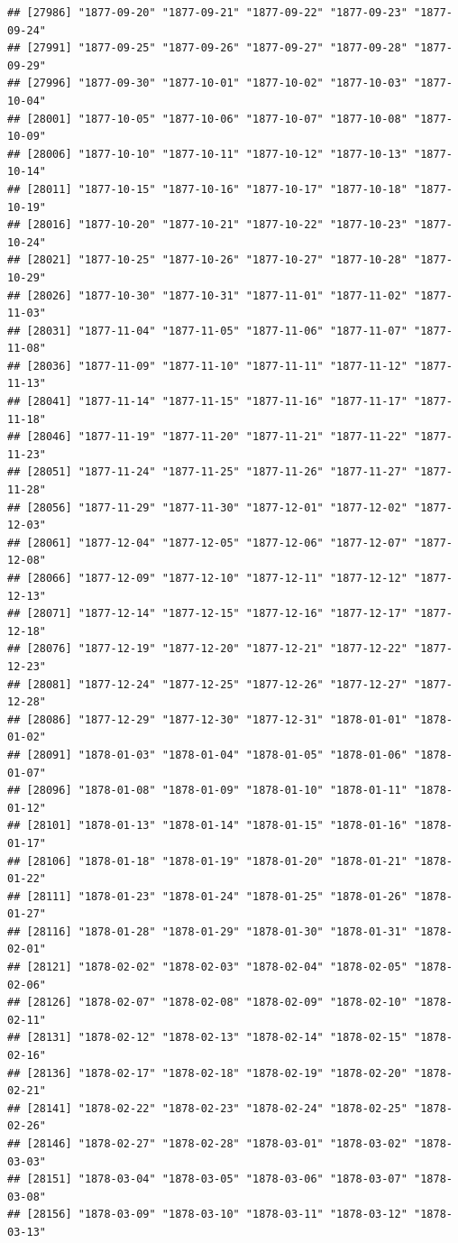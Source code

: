 \documentclass{article}\usepackage[]{graphicx}\usepackage[]{color}
\makeatletter
\newenvironment{kframe}{%
 \def\at@end@of@kframe{}%
 \ifinner\ifhmode%
  \def\at@end@of@kframe{\end{minipage}}%
  \begin{minipage}{\columnwidth}%
 \fi\fi%
 \def\FrameCommand##1{\hskip\@totalleftmargin \hskip-\fboxsep
 \colorbox{shadecolor}{##1}\hskip-\fboxsep
     \hskip-\linewidth \hskip-\@totalleftmargin \hskip\columnwidth}%
 \MakeFramed {\advance\hsize-\width
   \@totalleftmargin\z@ \linewidth\hsize
   \@setminipage}}%
 {\par\unskip\endMakeFramed%
 \at@end@of@kframe}
\newenvironment{knitrout}{}{} %
\makeatother
\begin{document}
\begin{description}
\begin{knitrout}
\begin{kframe}
\begin{verbatim}
## [27986] "1877-09-20" "1877-09-21" "1877-09-22" "1877-09-23" "1877-09-24"
## [27991] "1877-09-25" "1877-09-26" "1877-09-27" "1877-09-28" "1877-09-29"
## [27996] "1877-09-30" "1877-10-01" "1877-10-02" "1877-10-03" "1877-10-04"
## [28001] "1877-10-05" "1877-10-06" "1877-10-07" "1877-10-08" "1877-10-09"
## [28006] "1877-10-10" "1877-10-11" "1877-10-12" "1877-10-13" "1877-10-14"
## [28011] "1877-10-15" "1877-10-16" "1877-10-17" "1877-10-18" "1877-10-19"
## [28016] "1877-10-20" "1877-10-21" "1877-10-22" "1877-10-23" "1877-10-24"
## [28021] "1877-10-25" "1877-10-26" "1877-10-27" "1877-10-28" "1877-10-29"
## [28026] "1877-10-30" "1877-10-31" "1877-11-01" "1877-11-02" "1877-11-03"
## [28031] "1877-11-04" "1877-11-05" "1877-11-06" "1877-11-07" "1877-11-08"
## [28036] "1877-11-09" "1877-11-10" "1877-11-11" "1877-11-12" "1877-11-13"
## [28041] "1877-11-14" "1877-11-15" "1877-11-16" "1877-11-17" "1877-11-18"
## [28046] "1877-11-19" "1877-11-20" "1877-11-21" "1877-11-22" "1877-11-23"
## [28051] "1877-11-24" "1877-11-25" "1877-11-26" "1877-11-27" "1877-11-28"
## [28056] "1877-11-29" "1877-11-30" "1877-12-01" "1877-12-02" "1877-12-03"
## [28061] "1877-12-04" "1877-12-05" "1877-12-06" "1877-12-07" "1877-12-08"
## [28066] "1877-12-09" "1877-12-10" "1877-12-11" "1877-12-12" "1877-12-13"
## [28071] "1877-12-14" "1877-12-15" "1877-12-16" "1877-12-17" "1877-12-18"
## [28076] "1877-12-19" "1877-12-20" "1877-12-21" "1877-12-22" "1877-12-23"
## [28081] "1877-12-24" "1877-12-25" "1877-12-26" "1877-12-27" "1877-12-28"
## [28086] "1877-12-29" "1877-12-30" "1877-12-31" "1878-01-01" "1878-01-02"
## [28091] "1878-01-03" "1878-01-04" "1878-01-05" "1878-01-06" "1878-01-07"
## [28096] "1878-01-08" "1878-01-09" "1878-01-10" "1878-01-11" "1878-01-12"
## [28101] "1878-01-13" "1878-01-14" "1878-01-15" "1878-01-16" "1878-01-17"
## [28106] "1878-01-18" "1878-01-19" "1878-01-20" "1878-01-21" "1878-01-22"
## [28111] "1878-01-23" "1878-01-24" "1878-01-25" "1878-01-26" "1878-01-27"
## [28116] "1878-01-28" "1878-01-29" "1878-01-30" "1878-01-31" "1878-02-01"
## [28121] "1878-02-02" "1878-02-03" "1878-02-04" "1878-02-05" "1878-02-06"
## [28126] "1878-02-07" "1878-02-08" "1878-02-09" "1878-02-10" "1878-02-11"
## [28131] "1878-02-12" "1878-02-13" "1878-02-14" "1878-02-15" "1878-02-16"
## [28136] "1878-02-17" "1878-02-18" "1878-02-19" "1878-02-20" "1878-02-21"
## [28141] "1878-02-22" "1878-02-23" "1878-02-24" "1878-02-25" "1878-02-26"
## [28146] "1878-02-27" "1878-02-28" "1878-03-01" "1878-03-02" "1878-03-03"
## [28151] "1878-03-04" "1878-03-05" "1878-03-06" "1878-03-07" "1878-03-08"
## [28156] "1878-03-09" "1878-03-10" "1878-03-11" "1878-03-12" "1878-03-13"

\end{verbatim}
\end{kframe}
\end{knitrout}
\end{description}
\end{document}
